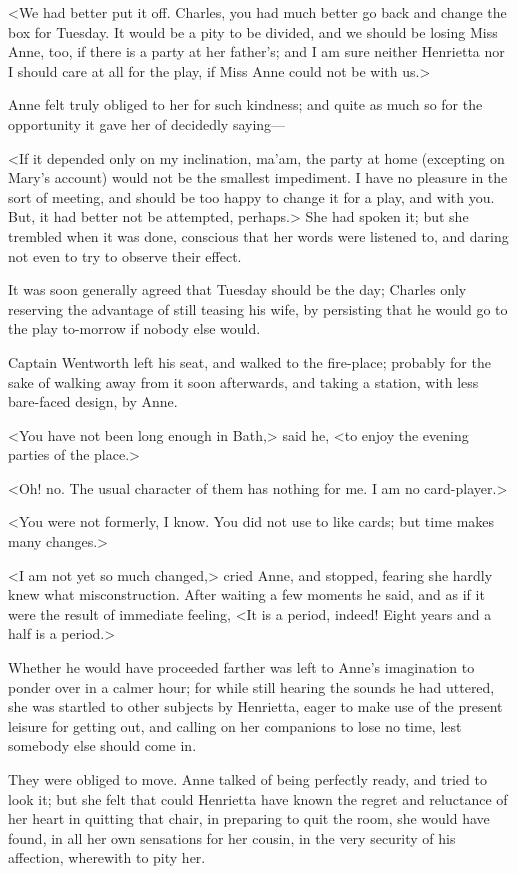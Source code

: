 <We had better put it off. Charles, you had much better go back and change the box for Tuesday. It would be a pity to be divided, and we should be losing Miss Anne, too, if there is a party at her father's; and I am sure neither Henrietta nor I should care at all for the play, if Miss Anne could not be with us.>

Anne felt truly obliged to her for such kindness; and quite as much so for the opportunity it gave her of decidedly saying—

<If it depended only on my inclination, ma'am, the party at home (excepting on Mary's account) would not be the smallest impediment. I have no pleasure in the sort of meeting, and should be too happy to change it for a play, and with you. But, it had better not be attempted, perhaps.> She had spoken it; but she trembled when it was done, conscious that her words were listened to, and daring not even to try to observe their effect.

It was soon generally agreed that Tuesday should be the day; Charles only reserving the advantage of still teasing his wife, by persisting that he would go to the play to-morrow if nobody else would.

Captain Wentworth left his seat, and walked to the fire-place; probably for the sake of walking away from it soon afterwards, and taking a station, with less bare-faced design, by Anne.

<You have not been long enough in Bath,> said he, <to enjoy the evening parties of the place.>

<Oh! no. The usual character of them has nothing for me. I am no card-player.>

<You were not formerly, I know. You did not use to like cards; but time makes many changes.>

<I am not yet so much changed,> cried Anne, and stopped, fearing she hardly knew what misconstruction. After waiting a few moments he said, and as if it were the result of immediate feeling, <It is a period, indeed! Eight years and a half is a period.>

Whether he would have proceeded farther was left to Anne's imagination to ponder over in a calmer hour; for while still hearing the sounds he had uttered, she was startled to other subjects by Henrietta, eager to make use of the present leisure for getting out, and calling on her companions to lose no time, lest somebody else should come in.

They were obliged to move. Anne talked of being perfectly ready, and tried to look it; but she felt that could Henrietta have known the regret and reluctance of her heart in quitting that chair, in preparing to quit the room, she would have found, in all her own sensations for her cousin, in the very security of his affection, wherewith to pity her.

